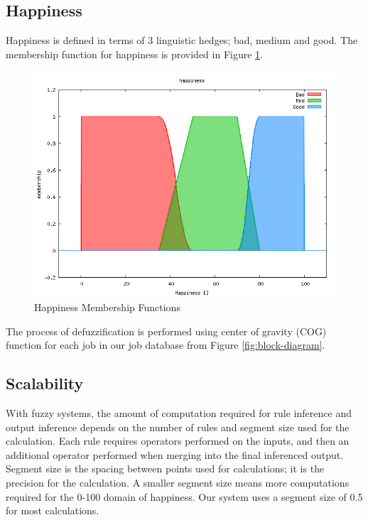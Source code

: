 \documentclass[12pt,fleqn,reqno,letterpaper]{article}
\begin{document}
\subsection{Happiness}
\label{sec:happiness}

Happiness is defined in terms of 3 linguistic hedges; bad, medium and good. The membership function for happiness is provided in Figure \ref{fig:HAPPINESS-MF}.

\begin{figure}[H]
  \centering
  \includegraphics[scale=0.5,natwidth=640,natheight=480]{fig/happiness.png}
  \caption{Happiness Membership Functions}
  \label{fig:HAPPINESS-MF}
\end{figure}

The process of defuzzification is performed using center of gravity (COG) function for each job in our job database from Figure \ref{fig:block-diagram}.

\subsection{Scalability}
With fuzzy systems, the amount of computation required for rule inference and output inference depends on the number of rules and segment size used for the calculation. Each rule requires operators performed on the inputs, and then an additional operator performed when merging into the final inferenced output. Segment size is the spacing between points used for calculations; it is the precision for the calculation. A smaller segment size means more computations required for the 0-100 domain of happiness. Our system uses a segment size of 0.5 for most calculations.
\end{document}
